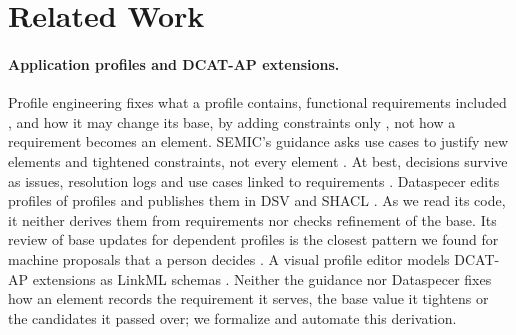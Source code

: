 \section{Related Work}\label{sec:related}

\paragraph{Application profiles and \acs{DCAT-AP} extensions.}
Profile engineering fixes what a profile contains, functional requirements included
\cite{nilsson2008singapore,coyle2009dcap}, and how it may change its base, by adding constraints only
\cite{w3cdcat3}, not how a requirement becomes an element.
\ac{SEMIC}'s guidance asks use cases to justify new elements and tightened constraints, not every element
\cite{semicreuse2026}.
At best, decisions survive as issues, resolution logs and use cases linked to requirements
\cite{dragan2019maintenance,statdcatap,w3cdcatucr}.
Dataspecer edits profiles of profiles and publishes them in \ac{DSV} and \ac{SHACL}
\cite{stenchlak2022dataspecer,klimek2024dataspecer,klimek2026dsv}. As we read its code, it neither derives them
from requirements nor checks refinement of the base. Its review of base updates for dependent profiles is the
closest pattern we found for machine proposals that a person decides .
A visual profile editor models \ac{DCAT-AP} extensions as \ac{LinkML} schemas \cite{moxon2026linkml}
.
Neither the guidance nor Dataspecer fixes how an element records the requirement it serves, the base value it
tightens or the candidates it passed over; we formalize and automate this derivation.

